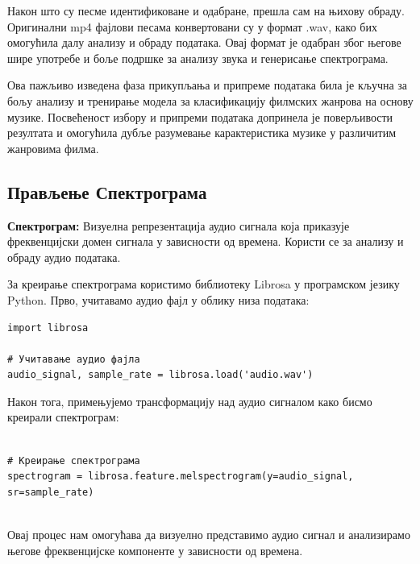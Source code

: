 \documentclass{article}
\begin{document}
Након што су песме идентификоване и одабране, прешла сам на њихову обраду. Оригинални mp4 фајлови песама конвертовани су у формат .wav, како бих омогућила далу анализу и обраду података. Овај формат је одабран због његове шире употребе и боље подршке за анализу звука и генерисање спектрограма.

Ова пажљиво изведена фаза прикупљања и припреме података била је кључна за бољу анализу и тренирање модела за класификацију филмских жанрова на основу музике. Посвећеност избору и припреми података допринела је поверљивости резултата и омогућила дубље разумевање карактеристика музике у различитим жанровима филма.

\subsection{Прављење Спектрограма}
\textbf{Спектрограм:} Визуелна репрезентација аудио сигнала која приказује фреквенцијски домен сигнала у зависности од времена. Користи се за анализу и обраду аудио података.

За креирање спектрограма користимо библиотеку Librosa у програмском језику Python. Прво, учитавамо аудио фајл у облику низа података:


\begin{verbatim}
import librosa

# Учитавање аудио фајла
audio_signal, sample_rate = librosa.load('audio.wav') 
\end{verbatim}


Након тога, примењујемо трансформацију над аудио сигналом како бисмо креирали спектрограм:

\begin{verbatim}

# Креирање спектрограма
spectrogram = librosa.feature.melspectrogram(y=audio_signal, sr=sample_rate)


\end{verbatim}


Овај процес нам омогућава да визуелно представимо аудио сигнал и анализирамо његове фреквенцијске компоненте у зависности од времена. \\ \\
\end{document}
